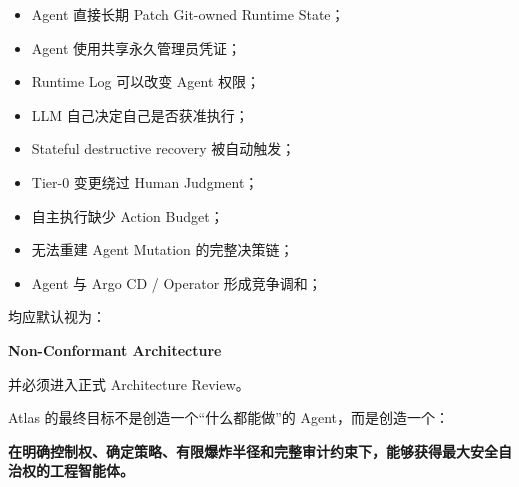 \documentclass[11pt,a4paper]{article}
\begin{document}
\begin{itemize}
  \item Agent 直接长期 Patch Git-owned Runtime State；
  \item Agent 使用共享永久管理员凭证；
  \item Runtime Log 可以改变 Agent 权限；
  \item LLM 自己决定自己是否获准执行；
  \item Stateful destructive recovery 被自动触发；
  \item Tier-0 变更绕过 Human Judgment；
  \item 自主执行缺少 Action Budget；
  \item 无法重建 Agent Mutation 的完整决策链；
  \item Agent 与 Argo CD / Operator 形成竞争调和；
\end{itemize}
均应默认视为：

\begin{gfmBlockquote}
\textbf{Non-Conformant Architecture}
\end{gfmBlockquote}
并必须进入正式 Architecture Review。

Atlas 的最终目标不是创造一个“什么都能做”的 Agent，而是创造一个：

\begin{gfmBlockquote}
\textbf{在明确控制权、确定策略、有限爆炸半径和完整审计约束下，能够获得最大安全自治权的工程智能体。}
\end{gfmBlockquote}
\end{document}

